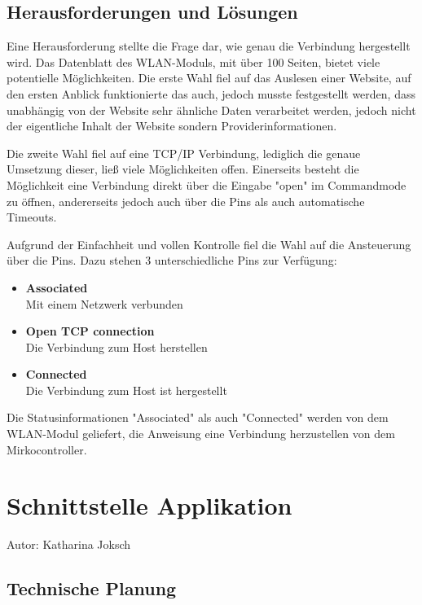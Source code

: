   \subsection{Herausforderungen und Lösungen}
  Eine Herausforderung stellte die Frage dar, wie genau die Verbindung hergestellt wird. Das Datenblatt des WLAN-Moduls, mit über 100 Seiten, bietet viele potentielle Möglichkeiten.
  Die erste Wahl fiel auf das Auslesen einer Website, auf den ersten Anblick funktionierte das auch, jedoch musste festgestellt werden, dass unabhängig von der Website sehr ähnliche
  Daten verarbeitet werden, jedoch nicht der eigentliche Inhalt der Website sondern Providerinformationen.

  Die zweite Wahl fiel auf eine TCP/IP Verbindung, lediglich die genaue Umsetzung dieser, ließ viele Möglichkeiten offen. Einerseits besteht die Möglichkeit eine Verbindung direkt
  über die Eingabe "open" im Commandmode zu öffnen, andererseits jedoch auch über die Pins als auch automatische Timeouts.

  Aufgrund der Einfachheit und vollen Kontrolle fiel die Wahl auf die Ansteuerung über die Pins.
  Dazu stehen 3 unterschiedliche Pins zur Verfügung:
  \begin{itemize}
    \item \textbf{Associated}\\
    Mit einem Netzwerk verbunden
    \item \textbf{Open TCP connection}\\
    Die Verbindung zum Host herstellen
    \item \textbf{Connected}\\
    Die Verbindung zum Host ist hergestellt
  \end{itemize}
  Die Statusinformationen "Associated" als auch "Connected" werden von dem WLAN-Modul geliefert, die Anweisung eine Verbindung herzustellen von dem Mirkocontroller.

\pagebreak
\section{Schnittstelle Applikation}
Autor: Katharina Joksch\\

  \subsection{Technische Planung}

